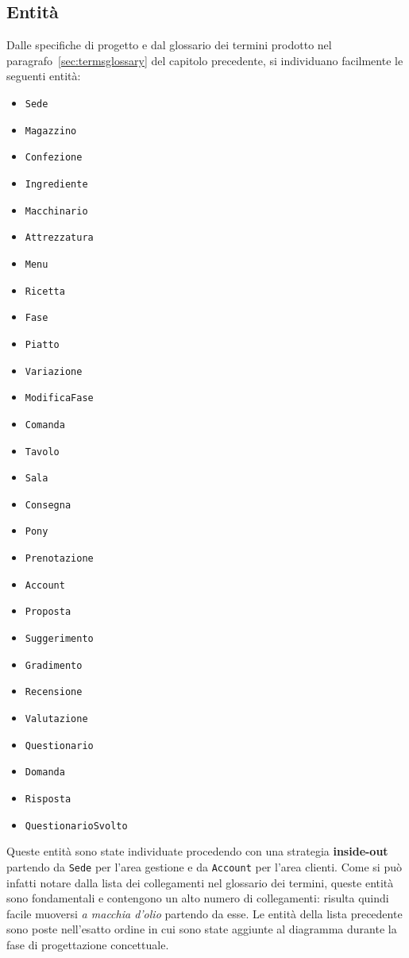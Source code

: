 \subsection{Entità}
Dalle specifiche di progetto e dal glossario dei termini prodotto nel
paragrafo~\vref{sec:termsglossary} del capitolo precedente, si individuano facilmente
le seguenti entità:
\begin{multicols}{3}
\begin{itemize}
    \item\tt Sede
    \item\tt Magazzino
    \item\tt Confezione
    \item\tt Ingrediente
    \item\tt Macchinario
    \item\tt Attrezzatura
    \item\tt Menu
    \item\tt Ricetta
    \item\tt Fase
    \item\tt Piatto
    \item\tt Variazione
    \item\tt ModificaFase
    \item\tt Comanda
    \item\tt Tavolo
    \item\tt Sala
    \item\tt Consegna
    \item\tt Pony
    \item\tt Prenotazione
\end{itemize}
\begin{itemize}
    \item\tt Account
    \item\tt Proposta
    \item\tt Suggerimento
    \item\tt Gradimento
    \item\tt Recensione
    \item\tt Valutazione
    \item\tt Questionario
    \item\tt Domanda
    \item\tt Risposta
    \item\tt QuestionarioSvolto
\end{itemize}
\end{multicols}
Queste entità sono state individuate procedendo con una strategia {\bf inside-out}
partendo da {\tt Sede} per l'area gestione e da {\tt Account} per l'area clienti. Come
si può infatti notare dalla lista dei collegamenti nel glossario dei termini, queste
entità sono fondamentali e contengono un alto numero di collegamenti: risulta quindi
facile muoversi {\it a macchia d'olio} partendo da esse.
Le entità della lista precedente sono poste nell'esatto ordine in cui sono state
aggiunte al diagramma durante la fase di progettazione concettuale.
